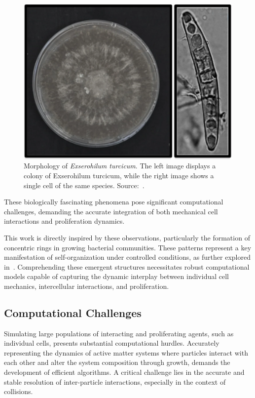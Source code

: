 \documentclass[conference]{IEEEtran}
\begin{document}
\begin{figure}
    \centering
    \includegraphics[width=\linewidth]{figures/real-bacteria/Exserohilum turcicum.png}
    \caption{Morphology of \textit{Exserohilum turcicum}. The left image displays a colony of Exserohilum turcicum, while the right image shows a single cell of the same species. Source:~\cite{Bankole2023}.}
    \label{fig:exserohilum_turcicum}
\end{figure}

These biologically fascinating phenomena pose significant computational challenges, demanding the accurate integration of both mechanical cell interactions and proliferation dynamics.

This work is directly inspired by these observations, particularly the formation of concentric rings in growing bacterial communities. These patterns represent a key manifestation of self-organization under controlled conditions, as further explored in~\cite{Weady2024}. Comprehending these emergent structures necessitates robust computational models capable of capturing the dynamic interplay between individual cell mechanics, intercellular interactions, and proliferation.

\subsection{Computational Challenges}

Simulating large populations of interacting and proliferating agents, such as individual cells, presents substantial computational hurdles. Accurately representing the dynamics of active matter systems where particles interact with each other and alter the system composition through growth, demands the development of efficient algorithms. A critical challenge lies in the accurate and stable resolution of inter-particle interactions, especially in the context of collisions.
\end{document}
